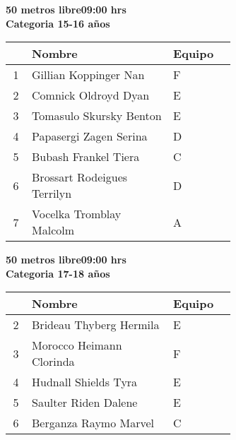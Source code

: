 \begin{minipage}{0.95\linewidth}\vspace{0.5cm} 
\begin{flushleft}
\textbf{
\hspace{-0.15cm}50 metros libre\hspace{1.5cm}09:00 hrs \\Categoria 15-16 años}\vspace{-0.2cm} 
\end{flushleft}
\begin{tabular}{cp{0.63\linewidth}l}
\hline
& \textbf{Nombre} & \textbf{Equipo} \\ \hline
1 & Gillian Koppinger Nan & F \\ 
2 & Comnick Oldroyd Dyan & E \\ 
3 & Tomasulo Skursky Benton & E \\ 
4 & Papasergi Zagen Serina & D \\ 
5 & Bubash Frankel Tiera & C \\ 
6 & Brossart Rodeigues Terrilyn & D \\ 
7 & Vocelka Tromblay Malcolm & A \\ 
\end{tabular}
\end{minipage}
\begin{minipage}{0.95\linewidth}\vspace{0.5cm} 
\begin{flushleft}
\textbf{
\hspace{-0.15cm}50 metros libre\hspace{1.5cm}09:00 hrs \\Categoria 17-18 años}\vspace{-0.2cm} 
\end{flushleft}
\begin{tabular}{cp{0.63\linewidth}l}
\hline
& \textbf{Nombre} & \textbf{Equipo} \\ \hline
2 & Brideau Thyberg Hermila & E \\ 
3 & Morocco Heimann Clorinda & F \\ 
4 & Hudnall Shields Tyra & E \\ 
5 & Saulter Riden Dalene & E \\ 
6 & Berganza Raymo Marvel & C \\ 
\end{tabular}
\end{minipage}
